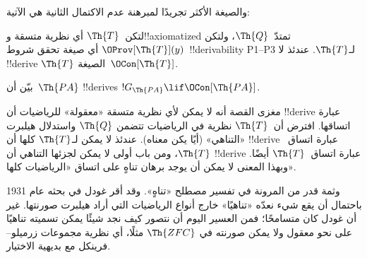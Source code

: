 \documentclass[../../../include/open-logic-section]{subfiles}
\begin{document}
والصيغة الأكثر تجريدًا لمبرهنة عدم الاكتمال الثانية هي الآتية:

\begin{thm}
 لتكن~$\Th{T}$ أي نظرية
متسقة و!!{axiomatized} تمتدّ~$\Th{Q}$، ولتكن
$\OProv[\Th{T}](y)$ أي صيغة تحقق شروط~!!{derivability} P1--P3
لـ$\Th{T}$. عندئذ لا !!{derive} $\Th{T}$ الصيغة~$\OCon[\Th{T}]$.
\end{thm}

\begin{prob}
بيّن أن~$\Th{PA}$ !!{derive}s $!G_{\Th{PA}} \lif \OCon[\Th{PA}]$.
\end{prob}

\begin{digress}
مغزى القصة أنه لا يمكن لأي نظرية متسقة «معقولة» للرياضيات أن
!!{derive} عبارة اتساقها. افترض أن~$\Th{T}$ نظرية في الرياضيات تتضمن
$\Th{Q}$ واستدلال هيلبرت «التناهي» (أيًا يكن معناه). عندئذ لا يمكن
لـ$\Th{T}$ كلها أن !!{derive} عبارة اتساق~$\Th{T}$، ومن باب أولى لا
يمكن لجزئها التناهي أن !!{derive} عبارة اتساق~$\Th{T}$ أيضًا. وبهذا
المعنى لا يمكن أن يوجد برهان تناهٍ على اتساق «الرياضيات كلها».

وثمة قدر من المرونة في تفسير مصطلح «تناهٍ». وقد أقر غودل في بحثه عام
1931 باحتمال أن يقع شيء نعدّه «تناهيًا» خارج أنواع الرياضيات التي أراد
هيلبرت صورنتها. غير أن غودل كان متسامحًا؛ فمن العسير اليوم أن نتصور
كيف نجد شيئًا يمكن تسميته تناهيًا على نحو معقول ولا يمكن صورنته في
$\Th{ZFC}$ مثلًا، أي نظرية مجموعات زرميلو--فرينكل مع بديهية الاختيار.
\end{digress}
\end{document}
